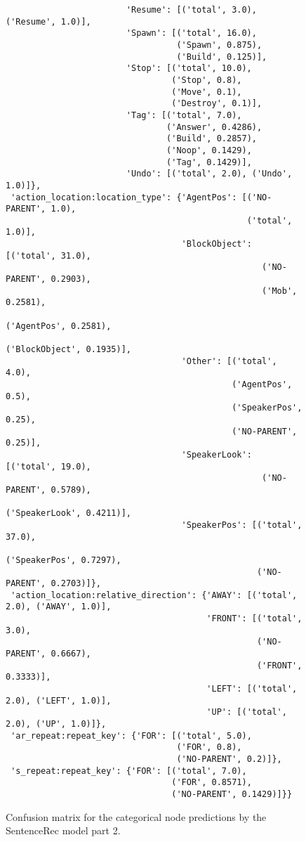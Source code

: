 \begin{figure}[t]
    \centering
    \begin{verbatim}
                        'Resume': [('total', 3.0), ('Resume', 1.0)],
                        'Spawn': [('total', 16.0),
                                  ('Spawn', 0.875),
                                  ('Build', 0.125)],
                        'Stop': [('total', 10.0),
                                 ('Stop', 0.8),
                                 ('Move', 0.1),
                                 ('Destroy', 0.1)],
                        'Tag': [('total', 7.0),
                                ('Answer', 0.4286),
                                ('Build', 0.2857),
                                ('Noop', 0.1429),
                                ('Tag', 0.1429)],
                        'Undo': [('total', 2.0), ('Undo', 1.0)]},
 'action_location:location_type': {'AgentPos': [('NO-PARENT', 1.0),
                                                ('total', 1.0)],
                                   'BlockObject': [('total', 31.0),
                                                   ('NO-PARENT', 0.2903),
                                                   ('Mob', 0.2581),
                                                   ('AgentPos', 0.2581),
                                                   ('BlockObject', 0.1935)],
                                   'Other': [('total', 4.0),
                                             ('AgentPos', 0.5),
                                             ('SpeakerPos', 0.25),
                                             ('NO-PARENT', 0.25)],
                                   'SpeakerLook': [('total', 19.0),
                                                   ('NO-PARENT', 0.5789),
                                                   ('SpeakerLook', 0.4211)],
                                   'SpeakerPos': [('total', 37.0),
                                                  ('SpeakerPos', 0.7297),
                                                  ('NO-PARENT', 0.2703)]},
 'action_location:relative_direction': {'AWAY': [('total', 2.0), ('AWAY', 1.0)],
                                        'FRONT': [('total', 3.0),
                                                  ('NO-PARENT', 0.6667),
                                                  ('FRONT', 0.3333)],
                                        'LEFT': [('total', 2.0), ('LEFT', 1.0)],
                                        'UP': [('total', 2.0), ('UP', 1.0)]},
 'ar_repeat:repeat_key': {'FOR': [('total', 5.0),
                                  ('FOR', 0.8),
                                  ('NO-PARENT', 0.2)]},
 's_repeat:repeat_key': {'FOR': [('total', 7.0),
                                 ('FOR', 0.8571),
                                 ('NO-PARENT', 0.1429)]}}

    \end{verbatim}
    \caption{Confusion matrix for the categorical node predictions by the SentenceRec model part 2.}
    \label{fig:conf_cat_senrec_2}
\end{figure}


